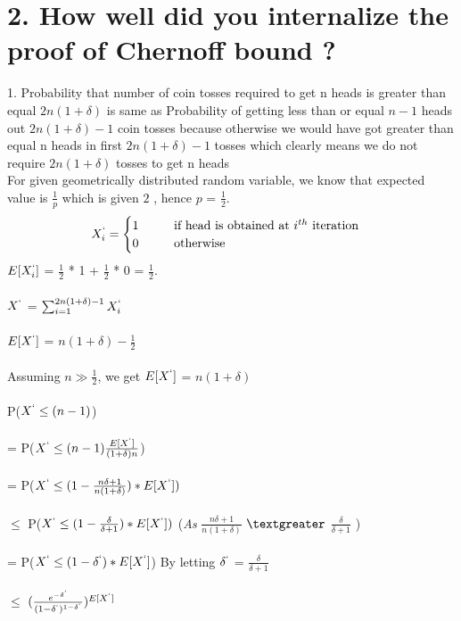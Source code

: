 \documentclass{article}
\begin{document}
\section*{2. How well did you internalize the proof of Chernoff bound ?} 
1. Probability that number of coin tosses required to get n heads is greater than equal $2n(1 + \delta)$ is same as Probability of getting less than or equal $n-1$ heads out $2n(1 + \delta) - 1$ coin tosses because otherwise we would have got greater than equal n heads in first  $2n(1 + \delta) - 1$ tosses which clearly means we do not require $2n(1 + \delta)$ tosses to get n heads \\ 
For given geometrically distributed random variable, we know that expected value is $\frac{1}{p}$ which is given $2$ , hence $p$ = $\frac{1}{2}$. \\
\[
	X_i^{`} =\begin{cases}
		1  \hspace{1cm}   $if head is obtained at $i^{th}$ iteration$ \\
		0  \hspace{1cm}   $otherwise$ 
		\end{cases}
\] %
$E[X_i^{`}]$ = $\frac{1}{2}$ * 1 + $\frac{1}{2}$ * 0 = $\frac{1}{2}$. \\\\
$X^{`}$ = $\sum_{i=1}^{2n(1 + \delta) - 1}X_i^{`}$ \\\\
$E[X^{`}]$ = $n(1+\delta) - \frac{1}{2}$ \\\\
Assuming $n \gg \frac{1}{2}$, we get $E[X^{`}]$ =  $n(1+\delta) $ \\\\
P($X^{`} \leq (n-1)$) \\\\
= P($X^{`} \leq (n-1)\frac{E[X^{`}]}{(1 + \delta)n}$)\\\\
= P($X^{`} \leq (1 - \frac{n\delta+1}{n(1+\delta)})*E[X^{`}])$ \\\\
$\leq$ P($X^{`} \leq (1 - \frac{\delta}{\delta + 1})*E[X^{`}])$ \hfill{(\textit{As} $\frac{n\delta+1}{n(1+\delta)}$ $\textgreater$ $\frac{\delta}{\delta + 1}$ )}\\\\
= P($X^{`} \leq (1 - \delta^{`})*E[X^{`}] $)
By letting $\delta^{`}$ = $\frac{\delta}{\delta + 1}$ \\\\ 
$\leq$ $(\frac{e^{-\delta^{`}}}{(1 - \delta^{`})^{1 - \delta^{`}}})^{E[X^{`}]}$\\\\
\end{document}

